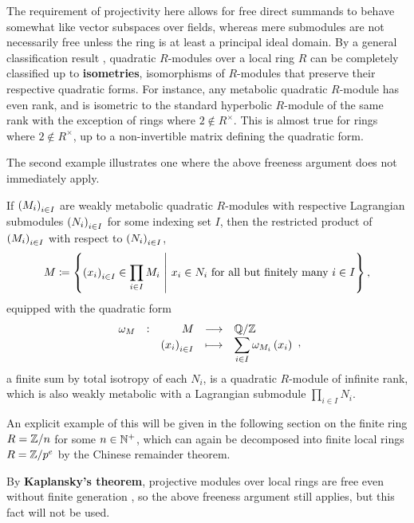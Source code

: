 \begin{remark}
The requirement of projectivity here allows for free direct summands to behave somewhat like vector subspaces over fields, whereas mere submodules are not necessarily free unless the ring is at least a principal ideal domain. By a general classification result \cite[Remark 2.20]{PR12}, quadratic $ R $-modules over a local ring $ R $ can be completely classified up to \textbf{isometries}, isomorphisms of $ R $-modules that preserve their respective quadratic forms. For instance, any metabolic quadratic $ R $-module has even rank, and is isometric to the standard hyperbolic $ R $-module of the same rank with the exception of rings where $ 2 \not\in R^\times $. This is almost true for rings where $ 2 \not\in R^\times $, up to a non-invertible matrix defining the quadratic form.
\end{remark}

The second example illustrates one where the above freeness argument does not immediately apply.

\begin{example}
If $ \br{M_i}_{i \in I} $ are weakly metabolic quadratic $ R $-modules with respective Lagrangian submodules $ \br{N_i}_{i \in I} $ for some indexing set $ I $, then the restricted product of $ \br{M_i}_{i \in I} $ with respect to $ \br{N_i}_{i \in I} $,
$$ M \coloneqq \cbr{\br{x_i}_{i \in I} \in \prod_{i \in I} M_i \st x_i \in N_i \ \text{for all but finitely many} \ i \in I}, $$
equipped with the quadratic form
$$ \function[\omega_M]{M}{\QQ / \ZZ}{\br{x_i}_{i \in I}}{\displaystyle\sum_{i \in I} \omega_{M_i}\br{x_i}}, $$
a finite sum by total isotropy of each $ N_i $, is a quadratic $ R $-module of infinite rank, which is also weakly metabolic with a Lagrangian submodule $ \prod_{i \in I} N_i $.
\end{example}

An explicit example of this will be given in the following section on the finite ring $ R = \mathbb{Z} / n $ for some $ n \in \mathbb{N}^+ $, which can again be decomposed into finite local rings $ R = \mathbb{Z} / p^e $ by the Chinese remainder theorem.

\begin{remark}
By \textbf{Kaplansky's theorem}, projective modules over local rings are free even without finite generation \cite[Theorem 2]{Kap58}, so the above freeness argument still applies, but this fact will not be used.
\end{remark}

\pagebreak

